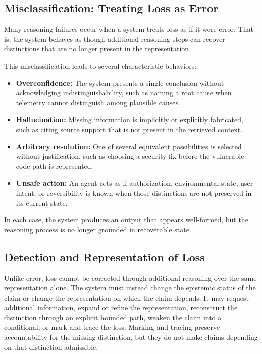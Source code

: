 \documentclass[11pt]{article}
\begin{document}
\subsection{Misclassification: Treating Loss as Error}

Many reasoning failures occur when a system treats loss as if it were error. That is, the system behaves as though additional reasoning steps can recover distinctions that are no longer present in the representation.

This misclassification leads to several characteristic behaviors:
\begin{itemize}[leftmargin=1.5em]
    \item \textbf{Overconfidence:} The system presents a single conclusion without acknowledging indistinguishability, such as naming a root cause when telemetry cannot distinguish among plausible causes.
    \item \textbf{Hallucination:} Missing information is implicitly or explicitly fabricated, such as citing source support that is not present in the retrieved context.
    \item \textbf{Arbitrary resolution:} One of several equivalent possibilities is selected without justification, such as choosing a security fix before the vulnerable code path is represented.
    \item \textbf{Unsafe action:} An agent acts as if authorization, environmental state, user intent, or reversibility is known when those distinctions are not preserved in its current state.
\end{itemize}

In each case, the system produces an output that appears well-formed, but the reasoning process is no longer grounded in recoverable state.

\subsection{Detection and Representation of Loss}

Unlike error, loss cannot be corrected through additional reasoning over the same representation alone. The system must instead change the epistemic status of the claim or change the representation on which the claim depends. It may request additional information, expand or refine the representation, reconstruct the distinction through an explicit bounded path, weaken the claim into a conditional, or mark and trace the loss. Marking and tracing preserve accountability for the missing distinction, but they do not make claims depending on that distinction admissible.
\end{document}
